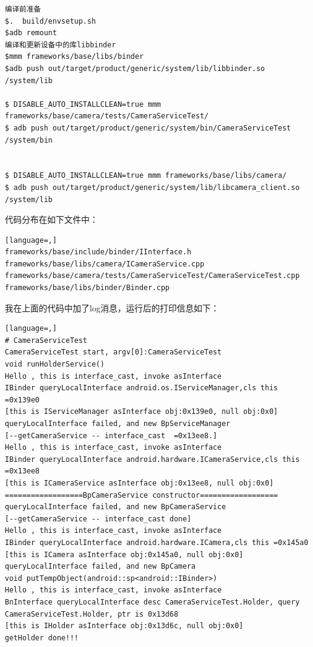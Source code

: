 \documentclass[a4paper,11pt]{article}
\begin{document}
\begin{appendices}
\begin{lstlisting}
编译前准备
$.  build/envsetup.sh
$adb remount
编译和更新设备中的库libbinder 
$mmm frameworks/base/libs/binder
$adb push out/target/product/generic/system/lib/libbinder.so  /system/lib

$ DISABLE_AUTO_INSTALLCLEAN=true mmm frameworks/base/camera/tests/CameraServiceTest/ 
$ adb push out/target/product/generic/system/bin/CameraServiceTest  /system/bin


$ DISABLE_AUTO_INSTALLCLEAN=true mmm frameworks/base/libs/camera/
$ adb push out/target/product/generic/system/lib/libcamera_client.so /system/lib
\end{lstlisting}

代码分布在如下文件中：
\begin{lstlisting}[language=,]
frameworks/base/include/binder/IInterface.h
frameworks/base/libs/camera/ICameraService.cpp
frameworks/base/camera/tests/CameraServiceTest/CameraServiceTest.cpp
frameworks/base/libs/binder/Binder.cpp
\end{lstlisting}
我在上面的代码中加了log消息，运行后的打印信息如下：

\begin{lstlisting}[language=,]
# CameraServiceTest
CameraServiceTest start, argv[0]:CameraServiceTest
void runHolderService()
Hello , this is interface_cast, invoke asInterface
IBinder queryLocalInterface android.os.IServiceManager,cls this =0x139e0
[this is IServiceManager asInterface obj:0x139e0, null obj:0x0]
queryLocalInterface failed, and new BpServiceManager
[--getCameraService -- interface_cast  =0x13ee8.]
Hello , this is interface_cast, invoke asInterface
IBinder queryLocalInterface android.hardware.ICameraService,cls this =0x13ee8
[this is ICameraService asInterface obj:0x13ee8, null obj:0x0]
==================BpCameraService constructor==================
queryLocalInterface failed, and new BpCameraService
[--getCameraService -- interface_cast done]
Hello , this is interface_cast, invoke asInterface
IBinder queryLocalInterface android.hardware.ICamera,cls this =0x145a0
[this is ICamera asInterface obj:0x145a0, null obj:0x0]
queryLocalInterface failed, and new BpCamera
void putTempObject(android::sp<android::IBinder>)
Hello , this is interface_cast, invoke asInterface
BnInterface queryLocalInterface desc CameraServiceTest.Holder, query CameraServiceTest.Holder, ptr is 0x13d68
[this is IHolder asInterface obj:0x13d6c, null obj:0x0]
getHolder done!!!


\end{lstlisting}
\end{appendices}
\end{document}
